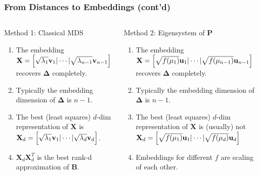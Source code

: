 \documentclass[professionalfonts,hyperref={pdfpagelabels=false,colorlinks=true,linkcolor=red}]{beamer}
\begin{document}
\begin{frame}
  \frametitle{From Distances to Embeddings (cont'd)}
  \begin{columns}[t]
  \begin{column}{0.45\textwidth}
    Method 1: Classical MDS
    \begin{enumerate}
    \item The embedding $\mathbf{X} = \Bigl[ \sqrt{\lambda_1} \mathbf{v}_1 |
        \cdots |
      \sqrt{\lambda_{n-1}} \mathbf{v}_{n-1} \Bigr]$ recovers
      $\bm{\Delta}$ completely.
    \item Typically the embedding dimension of $\bm{\Delta}$
      is $n-1$.
    \item The best (least squares) $d$-dim representation of
      $\mathbf{X}$ is $\mathbf{X}_d =  \Bigl[ \sqrt{\lambda_1} \mathbf{v}_1 |
       \cdots |
      \sqrt{\lambda_d} \mathbf{v}_{d} \Bigr]$.
        
    \item $\mathbf{X}_d \mathbf{X}_d^{T}$ is the best
      rank-d approximation of $\mathbf{B}$.
    \end{enumerate}
  \end{column}
  
  \begin{column}{0.55\textwidth}
    Method 2: Eigensystem of $\mathbf{P}$
    \begin{enumerate}
    \item The embedding 
      $\mathbf{X} = \Bigl[ \sqrt{f(\mu_1)} \mathbf{u}_1 |
       \cdots |
      \sqrt{f(\mu_{n-1})} \mathbf{u}_{n-1} \Bigr]$
      recovers 
      $\bm{\Delta}$ completely.
    \item Typically the embedding dimension of $\bm{\Delta}$
      is $n-1$.
    \item The best (least squares) $d$-dim representation of
      $\mathbf{X}$ is (usually) \alert{not}
      $\mathbf{X}_d = \Bigl[ \sqrt{f(\mu_1)} \mathbf{u}_1 |
       \cdots |
      \sqrt{f(\mu_d)} \mathbf{u}_d \Bigr]$
    \item Embeddings for different $f$ are scaling of each other.
    \end{enumerate}
  \end{column}
\end{columns}
\end{frame}
\end{document}
